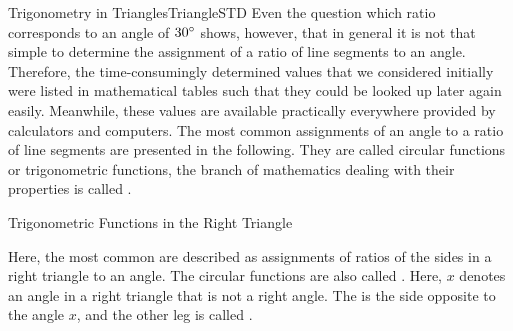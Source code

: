 \begin{MXContent}{Trigonometry in Triangles}{Triangle}{STD}
Even the question which ratio corresponds to an angle of $30^{\circ}$ shows, however,
that in general it is not that simple to determine the assignment of a ratio
of line segments to an angle.
Therefore, the time-consumingly determined values that we considered initially
were listed in mathematical tables such that they could be looked up later again easily.
Meanwhile, these values are available practically everywhere provided by calculators and 
computers. The most common assignments of an angle to a ratio of line segments are presented 
in the following. They are called circular functions or trigonometric functions, 
the branch of mathematics dealing with their properties is called 
.


\begin{MXInfo}{Trigonometric Functions in the Right Triangle}%
%

Here, the most common 
are described as assignments of ratios of the sides in a right triangle to an angle. 
The circular functions are also called .
Here, $x$ denotes an angle in a right triangle that is not a right angle.
The  is the side opposite to the angle $x$, 
and the other leg is called . 

\begin{center}
\end{center}


\end{MXInfo}
\end{MXContent}
